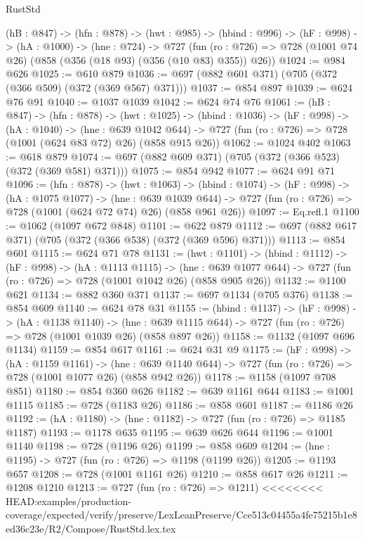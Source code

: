 \begin{lexlean}{RustStd}
\begin{coremodule}
{\begin{coremodule}
  (hB : @847) ->
  (hfn : @878) ->
  (hwt : @985) ->
  (hbind : @996) ->
  (hF : @998) ->
  (hA : @1000) ->
  (hne : @724) ->
  @727 (fun (ro : @726) => @728 (@1001 @74 @26) (@858 (@356 (@18 @93) (@356 (@10 @83) @355)) @26))
@1024 := @984 @626
@1025 := @610 @879
@1036 := @697 (@882 @601 @371) (@705 (@372 (@366 @509) (@372 (@369 @567) @371)))
@1037 := @854 @897
@1039 := @624 @76 @91
@1040 := @1037 @1039
@1042 := @624 @74 @76
@1061 := (hB : @847) ->
  (hfn : @878) ->
  (hwt : @1025) ->
  (hbind : @1036) ->
  (hF : @998) ->
  (hA : @1040) ->
  (hne : @639 @1042 @644) ->
  @727 (fun (ro : @726) => @728 (@1001 (@624 @83 @72) @26) (@858 @915 @26))
@1062 := @1024 @402
@1063 := @618 @879
@1074 := @697 (@882 @609 @371) (@705 (@372 (@366 @523) (@372 (@369 @581) @371)))
@1075 := @854 @942
@1077 := @624 @91 @71
@1096 := (hfn : @878) ->
  (hwt : @1063) ->
  (hbind : @1074) ->
  (hF : @998) ->
  (hA : @1075 @1077) ->
  (hne : @639 @1039 @644) ->
  @727 (fun (ro : @726) => @728 (@1001 (@624 @72 @74) @26) (@858 @961 @26))
@1097 := Eq.refl.{1}
@1100 := @1062 (@1097 @672 @848)
@1101 := @622 @879
@1112 := @697 (@882 @617 @371) (@705 (@372 (@366 @538) (@372 (@369 @596) @371)))
@1113 := @854 @601
@1115 := @624 @71 @78
@1131 := (hwt : @1101) ->
  (hbind : @1112) ->
  (hF : @998) ->
  (hA : @1113 @1115) ->
  (hne : @639 @1077 @644) -> @727 (fun (ro : @726) => @728 (@1001 @1042 @26) (@858 @905 @26))
@1132 := @1100 @621
@1134 := @882 @360 @371
@1137 := @697 @1134 (@705 @376)
@1138 := @854 @609
@1140 := @624 @78 @31
@1155 := (hbind : @1137) ->
  (hF : @998) ->
  (hA : @1138 @1140) ->
  (hne : @639 @1115 @644) -> @727 (fun (ro : @726) => @728 (@1001 @1039 @26) (@858 @897 @26))
@1158 := @1132 (@1097 @696 @1134)
@1159 := @854 @617
@1161 := @624 @31 @9
@1175 := (hF : @998) ->
  (hA : @1159 @1161) ->
  (hne : @639 @1140 @644) -> @727 (fun (ro : @726) => @728 (@1001 @1077 @26) (@858 @942 @26))
@1178 := @1158 (@1097 @708 @851)
@1180 := @854 @360 @626
@1182 := @639 @1161 @644
@1183 := @1001 @1115
@1185 := @728 (@1183 @26)
@1186 := @858 @601
@1187 := @1186 @26
@1192 := (hA : @1180) -> (hne : @1182) -> @727 (fun (ro : @726) => @1185 @1187)
@1193 := @1178 @635
@1195 := @639 @626 @644
@1196 := @1001 @1140
@1198 := @728 (@1196 @26)
@1199 := @858 @609
@1204 := (hne : @1195) -> @727 (fun (ro : @726) => @1198 (@1199 @26))
@1205 := @1193 @657
@1208 := @728 (@1001 @1161 @26)
@1210 := @858 @617 @26
@1211 := @1208 @1210
@1213 := @727 (fun (ro : @726) => @1211)
<<<<<<<< HEAD:examples/production-coverage/expected/verify/preserve/LexLeanPreserve/Cce513c04455a4fe75215b1e8ed36c23e/R2/Compose/RustStd.lex.tex

\end{coremodule}}
\end{coremodule}
\end{lexlean}
